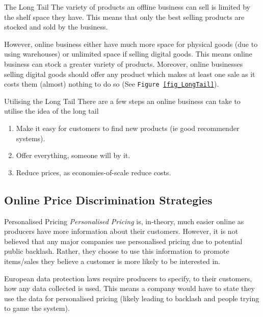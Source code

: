 \documentclass[11pt,a4paper]{article}
\begin{document}
  \begin{proposition}{The Long Tail}
    The variety of products an offline business can sell is limited by the shelf space they have. This means that only the best selling products are stocked and sold by the business.
    \par However, online business either have much more space for physical goods (due to using warehouses) or unlimited space if selling digital goods. This means online business can stock a greater variety of products. Moreover, online businesses selling digital goods should offer any product which makes at least one sale as it costs them (almost) nothing to do so (See \texttt{Figure \ref{fig_LongTail}}).
  \end{proposition}

  \begin{proposition}{Utilising the Long Tail}
    There are a few steps an online business can take to utilise the idea of the long tail
    \begin{enumerate}
      \item Make it easy for customers to find new products (ie good recommender systems).
      \item Offer everything, someone will by it.
      \item Reduce prices, as economies-of-scale reduce costs.
    \end{enumerate}
  \end{proposition}

\subsection{Online Price Discrimination Strategies} \label{sec_OnlinePriceDiscriminationStrategies}

  \begin{remark}{Personalised Pricing}
    \textit{Personalised Pricing} is, in-theory, much easier online as producers have more information about their customers. However, it is not believed that any major companies use personalised pricing due to potential public backlash. Rather, they choose to use this information to promote items/sales they believe a customer is more likely to be interested in.
    \par European data protection laws require producers to specify, to their customers, how any data collected is used. This means a company would have to state they use the data for personalised pricing (likely leading to backlash and people trying to game the system).
  \end{remark}
\end{document}

